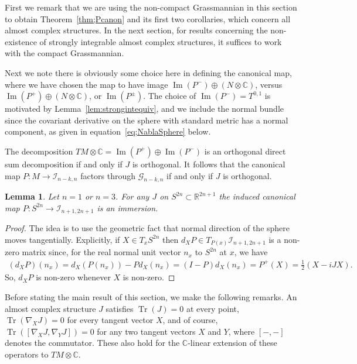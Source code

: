 \documentclass[11pt]{article}
\DeclareMathOperator{\Tr}{Tr}
\newtheorem{lem}[thm]{Lemma}
\numberwithin{equation}{section}
\newcommand{\R}{\mathbb{R}}
\newcommand{\CC}{\mathbb{C}}
\newcommand{\cG}{{\mathcal G}}
\newcommand{\cI}{{\mathcal I}}
\begin{document}
First we remark that we are using the non-compact Grassmannian in this section to obtain Theorem~\ref{thm;Pcanon} and its first two corollaries, which concern all almost complex structures. In the next section, for results concerning the non-existence of strongly integrable almost complex structures, it suffices to work with the compact Grassmannian.

Next we note there is obviously some choice here in defining the canonical map, where we have chosen the map to have image $\operatorname{Im}(P^-) \oplus ( N \otimes \CC )$, versus $\operatorname{Im}(P^+) \oplus ( N \otimes \CC )$, or $\operatorname{Im}(P^\pm)$. The choice of $\operatorname{Im}(P^-)= T^{0,1}$ is motivated by Lemma~\ref{lem:strongintequiv}, and we include the normal bundle since the covariant derivative on the sphere with standard metric has a normal component, as given in equation~\eqref{eq;NablaSphere} below.

\begin{rmk}The decomposition $TM \otimes \CC = \operatorname{Im}(P^+) \oplus \operatorname{Im}(P^-)$ is an orthogonal direct sum decomposition if and only if $J$ is orthogonal. It follows that the canonical map $P\colon M \to \cI_{n-k,n}$ factors through $\cG_{n-k,n}$ if and only if $J$ is orthogonal.
\end{rmk}

\begin{lem} \label{lem;Pcanonemb}
Let $n=1$ or $n=3$. For any $J$ on $S^{2n} \subset \R^{2n+1}$ the induced canonical map $P\colon S^{2n} \to \cI_{n+1,2n+1}$ is an immersion.
\end{lem}

\begin{proof} The idea is to use the geometric fact that normal direction of the sphere moves tangentially. Explicitly, if $X \in T_xS^{2n}$ then $d_X P \in T_{P(x)} \cI_{n+1,2n+1}$ is a non-zero matrix since, for the real normal unit vector $n_x$ to $S^{2n}$ at $x$, we have
\begin{gather*}
(d_XP)(n_x) = d_X(P(n_x)) - P d_X(n_x) = (I-P) d_X(n_x) = P^+(X) = \frac 1 2 (X - i J X).
\end{gather*}
So, $d_X P$ is non-zero whenever $X$ is non-zero.
\end{proof}

Before stating the main result of this section, we make the following remarks. An almost complex structure $J$ satisfies $\Tr(J)=0$ at every point, $\Tr(\nabla_X J) =0$ for every tangent vector $X$, and of course, $\Tr ([\nabla_X J, \nabla_Y J] )=0$ for any two tangent vectors $X$ and $Y$, where $[-,-]$ denotes the commutator. These also hold for the $\CC$-linear extension of these operators to $TM \otimes \CC$.
\end{document}
